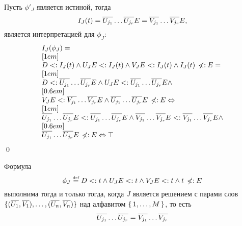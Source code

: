 \begin{proof*}
Пусть $\phi'_{J}$ является истиной, тогда
\[I_{J}(t) = \overline{{U}_{j_1}} \ldots \overline{{U}_{j_r}}{E} = \overline{{V}_{j_1}} \ldots \overline{{V}_{j_r}}{E},\] является интерпретацией для $\phi_{J}$:
\[
    \begin{array}{l}
    I_{J}(\phi_{J}) = \\
    [1em] \\
    D <: I_{J}(t) \land {U}_{J}{E} <: I_{J}(t) \land {V}_{J}{E} <: I_{J}(t) \land I_{J}(t) \:\not\!\!{<:}\: {E} = \\
    [1em] \\
    D <: \overline{{U}_{j_1}} \ldots \overline{{U}_{j_r}}{E} \land {U}_{J}{E} <: \overline{{U}_{j_1}} \ldots \overline{{U}_{j_r}}{E} \land \\
    [0.6em] \\
    {V}_{J}{E} <: \overline{{V}_{j_1}} \ldots \overline{{V}_{j_r}}{E} \land \overline{{U}_{j_1}} \ldots \overline{{U}_{j_r}}{E} \:\not\!\!{<:}\: {E} \Leftrightarrow \\
    [1em] \\
    \overline{{U}_{j_1}} \ldots \overline{{U}_{j_r}}{E} <: \overline{{U}_{j_1}} \ldots \overline{{U}_{j_r}}{E} \land
    \overline{{V}_{j_1}} \ldots \overline{{V}_{j_r}}{E} <: \overline{{V}_{j_1}} \ldots \overline{{V}_{j_r}}{E} \land \\
    [0.6em] \\
    \overline{{U}_{j_1}} \ldots \overline{{U}_{j_r}}{E} \:\not\!\!{<:}\: {E} \Leftrightarrow \top
    \end{array}
\]
\qed\end{proof*}
\begin{thm}{\label{thm:pcpphi3}}
   Формула
\[
      \phi_{J} \mathrel{\stackrel{\mbox{\normalfont\tiny def}}{=}} D <: t \land {U}_{J}{E} <: t \land {V}_{J}{E} <: t \land t \:\not\!\!{<:}\: {E}
\]
выполнима тогда и только тогда, когда $J$ является решением \pcp{} с парами слов $\lbrace (\overline{{U}_{1}}, \overline{{V}_{1}}), \ldots , (\overline{{U}_{n}}, \overline{{V}_{n}})\rbrace$ над алфавитом $\lbrace \, {1}{},\ldots,{M}{} \, \rbrace$, то есть
\[
    \overline{{U}_{j_1}} \ldots \overline{{U}_{j_r}} = \overline{{V}_{j_1}} \ldots \overline{{V}_{j_r}}
\]
\end{thm}
